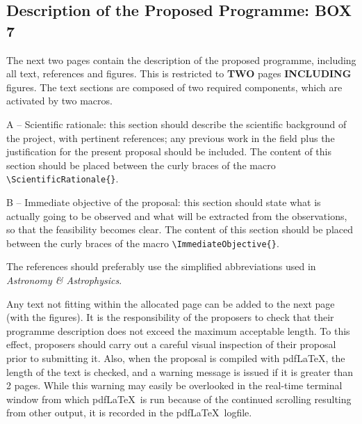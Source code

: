\documentclass{article}
\begin{document}
\subsection{Description of the Proposed Programme: {\bf BOX 7}}

The next two pages contain the description of the proposed programme,
including all text, references and figures.
This is restricted to {\bf TWO} pages {\bf INCLUDING} figures. The
text sections are composed of two required components, which are 
activated by two macros.

A -- Scientific rationale: this section should describe the scientific
background of the project, with pertinent references; any previous
work in the field plus the justification for the present proposal
should be included.  The content of this section should be placed
between the curly braces of the macro \verb|\ScientificRationale{}|. 

B -- Immediate objective of the proposal: this section should state what
is actually going to be observed and what will be extracted from the
observations, so that the feasibility becomes clear.  The content of
this section should be placed between the curly braces of the
macro \verb|\ImmediateObjective{}|.

The references should preferably use the simplified abbreviations used 
in {\em Astronomy \& Astrophysics\/}.

\medskip

 Any text not fitting within the allocated page can be
added to the next page (with the figures). 
It is the responsibility of the proposers to check that their
programme description does not exceed the maximum acceptable
length. To this effect, proposers should carry out a careful visual
inspection of their proposal prior to submitting
it. Also, when the proposal is compiled with pdf\LaTeX, the length of
the text is checked, and a warning message is issued if it is greater
than 2 pages. While this warning may easily be overlooked in the
real-time terminal window from which pdf\LaTeX\ is run because of the
continued scrolling resulting from other output, it is recorded in the
pdf\LaTeX\ logfile. 

\end{document}

